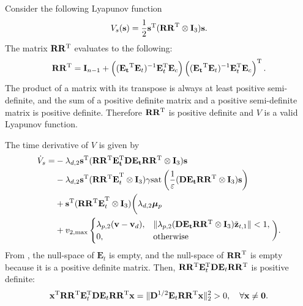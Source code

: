     
    Consider the following Lyapunov function
    \begin{equation}
        V_s(\mathbf{s}) = \frac{1}{2}\mathbf{s}^{\rm T} (\mathbf{RR}^{\rm T} \otimes \mathbf{I}_3)\mathbf{s}. 
    \end{equation}
    The matrix $\mathbf{R}\mathbf{R}^{\rm T}$ evaluates to the following:
\begin{equation}
    \mathbf{R}\mathbf{R}^{\rm T} = \mathbf{I}_{n-1} + \left((\mathbf{E_t}^{\rm T}\mathbf{E}_t)^{-1} \mathbf{E}_t^{\rm T} \mathbf{E}_c\right)\left((\mathbf{E_t}^{\rm T}\mathbf{E}_t)^{-1} \mathbf{E}_t^{\rm T} \mathbf{E}_c\right)^{\rm T}.
\end{equation}
The product of a matrix with its transpose is always at least positive semi-definite, and the sum of a positive definite matrix and a positive semi-definite matrix is positive definite. Therefore $\mathbf{R}\mathbf{R}^{\rm T}$ is positive definite and $V$ is a valid Lyapunov function.
    
    The time derivative of $V$ is given by
    \begin{equation}\label{eq:V_s_derivative}
        \begin{split}
            \dot{V}_s = &-\lambda_{d,2}\mathbf{s}^{\rm T}(\mathbf{RR^{\rm T} E_t^{\rm T} D E_t R R^{\rm T}}\otimes \mathbf{I}_3)\mathbf{s} \\
            &-\lambda_{d,2}\mathbf{s}^{\rm T} (\mathbf{RR^{\rm T} E}_t^{\rm T} \otimes \mathbf{I}_3)\gamma\mathrm{sat}\left(\frac{1}{\varepsilon}(\mathbf{DE_t R R^{\rm T}}\otimes \mathbf{I}_3)\mathbf{s}\right)\\
            &+ \mathbf{s}^{\rm T}(\mathbf{RR^{\rm T} E}_t^{\rm T}\otimes \mathbf{I}_3)\bigg(\lambda_{d,2}\bm{\mu}_p\\
            &+ v_{2,\max}\begin{cases}
            \lambda_{p,2}(\mathbf{v}-\mathbf{v}_d), & \|\lambda_{p,2}(\mathbf{DE_t R R^{\rm T}}\otimes \mathbf{I}_3)\tilde{\mathbf{z}}_{t,1}\| < 1,\\
            0, & \textrm{otherwise}
        \end{cases}\bigg).
        \end{split}
    \end{equation}
    From \cite[Theorem 3.3]{zelazo_agreement_2007}, the null-space of $\mathbf{E}_t$ is empty, and the null-space of $\mathbf{RR}^{\rm T}$ is empty because it is a positive definite matrix. Then, $\mathbf{R}\mathbf{R}^{\rm T}\mathbf{E}_t^{\rm T}\mathbf{D}\mathbf{E}_t \mathbf{R}\mathbf{R}^{\rm T}$ is positive definite:
\begin{gather}
    \mathbf{x}^{\rm T}\mathbf{R}\mathbf{R}^{\rm T}\mathbf{E}_t^{\rm T}\mathbf{D}\mathbf{E}_t \mathbf{R}\mathbf{R}^{\rm T} \mathbf{x} = \|\mathbf{D}^{1/2}\mathbf{E}_t\mathbf{R}\mathbf{R}^{\rm T} \mathbf{x}\|_2^2 > 0, \quad \forall \mathbf{x} \neq \mathbf{0}.
\end{gather}

